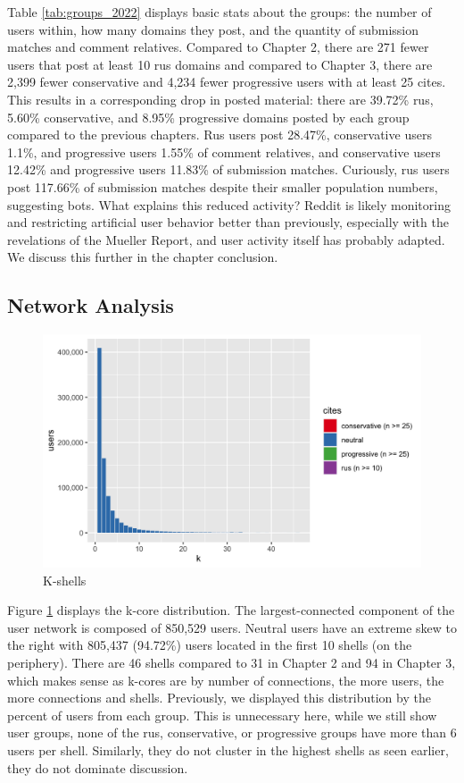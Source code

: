 \documentclass[doublespacing]{utdthesis}
\begin{document}
Table \ref{tab:groups_2022} displays basic stats about the groups: the number of users within, how many domains they post, and the quantity of submission matches and comment relatives.
Compared to Chapter 2, there are 271 fewer users that post at least 10 rus domains and compared to Chapter 3, there are 2,399 fewer conservative and 4,234 fewer progressive users with at least 25 cites.
This results in a corresponding drop in posted material: there are 39.72\% rus, 5.60\% conservative, and 8.95\% progressive domains posted by each group compared to the previous chapters.
Rus users post 28.47\%, conservative users 1.1\%, and progressive users 1.55\% of comment relatives, and conservative users 12.42\% and progressive users 11.83\% of submission matches.
Curiously, rus users post 117.66\% of submission matches despite their smaller population numbers, suggesting bots.
What explains this reduced activity?
Reddit is likely monitoring and restricting artificial user behavior better than previously, especially with the revelations of the Mueller Report, and user activity itself has probably adapted.
We discuss this further in the chapter conclusion.

\subsection{Network Analysis}

\begin{figure}[!ht]
\centering
\includegraphics[width=\textwidth]{2022/kshells}
\caption{K-shells}
\label{fig:kshells_2022}
\end{figure}

Figure \ref{fig:kshells_2022} displays the k-core distribution.
The largest-connected component of the user network is composed of 850,529 users.
Neutral users have an extreme skew to the right with 805,437 (94.72\%) users located in the first 10 shells (on the periphery).
There are 46 shells compared to 31 in Chapter 2 and 94 in Chapter 3, which makes sense as k-cores are by number of connections, the more users, the more connections and shells.
Previously, we displayed this distribution by the percent of users from each group.
This is unnecessary here, while we still show user groups, none of the rus, conservative, or progressive groups have more than 6 users per shell.
Similarly, they do not cluster in the highest shells as seen earlier, they do not dominate discussion.
\end{document}
